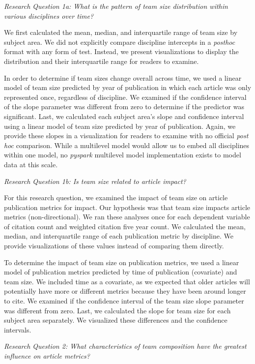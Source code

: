 \documentclass[
  man,floatsintext]{apa6}
\begin{document}
\emph{Research Question 1a: What is the pattern of team size distribution within various disciplines over time?}

We first calculated the mean, median, and interquartile range of team size by subject area. We did not explicitly compare discipline intercepts in a \emph{posthoc} format with any form of test. Instead, we present visualizations to display the distribution and their interquartile range for readers to examine.

In order to determine if team sizes change overall across time, we used a linear model of team size predicted by year of publication in which each article was only represented once, regardless of discipline. We examined if the confidence interval of the slope parameter was different from zero to determine if the predictor was significant. Last, we calculated each subject area's slope and confidence interval using a linear model of team size predicted by year of publication. Again, we provide these slopes in a visualization for readers to examine with no official \emph{post hoc} comparison. While a multilevel model would allow us to embed all disciplines within one model, no \emph{pyspark} multilevel model implementation exists to model data at this scale.

\emph{Research Question 1b: Is team size related to article impact?}

For this research question, we examined the impact of team size on article publication metrics for impact. Our hypothesis was that team size impacts article metrics (non-directional). We ran these analyses once for each dependent variable of citation count and weighted citation five year count. We calculated the mean, median, and interquartile range of each publication metric by discipline. We provide visualizations of these values instead of comparing them directly.

To determine the impact of team size on publication metrics, we used a linear model of publication metrics predicted by time of publication (covariate) and team size. We included time as a covariate, as we expected that older articles will potentially have more or different metrics because they have been around longer to cite. We examined if the confidence interval of the team size slope parameter was different from zero. Last, we calculated the slope for team size for each subject area separately. We visualized these differences and the confidence intervals.

\emph{Research Question 2: What characteristics of team composition have the greatest influence on article metrics?}
\end{document}
